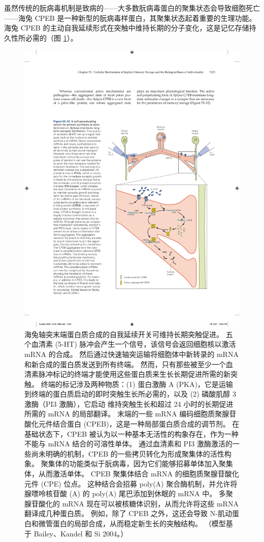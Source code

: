 虽然传统的朊病毒机制是致病的——大多数朊病毒蛋白的聚集状态会导致细胞死亡——海兔 CPEB 是一种新型的朊病毒样蛋白，其聚集状态起着重要的生理功能。 海兔 CPEB 的主动自我延续形式在突触中维持长期的分子变化，这是记忆存储持久性所必需的（图 \ref{fig:53_12}）。

\begin{figure}[htbp]
	\centering
	\includegraphics[width=0.7\linewidth]{chap53/fig_53_12}
	\caption{海兔轴突末端蛋白质合成的自我延续开关可维持长期突触促进。 五个血清素 (5-HT) 脉冲会产生一个信号，该信号会返回细胞核以激活 mRNA 的合成。 然后通过快速轴突运输将细胞体中新转录的 mRNA 和新合成的蛋白质发送到所有终端。 然而，只有那些被至少一个血清素脉冲标记的终端才能使用这些蛋白质来生长长期促进所需的新突触。 终端的标记涉及两种物质：(1) 蛋白激酶 A (PKA)，它是运输到终端的蛋白质启动的即时突触生长所必需的，以及 (2) 磷酸肌醇 3 激酶（PI3 激酶），它启动 维持突触生长和超过 24 小时的长期促进所需的 mRNA 的局部翻译。 末端的一些 mRNA 编码细胞质聚腺苷酸化元件结合蛋白 (CPEB)，这是一种局部蛋白质合成的调节剂。 在基础状态下，CPEB 被认为以一种基本无活性的构象存在，作为一种不能与 mRNA 结合的可溶性单体。 通过血清素和 PI3 激酶激活的一些尚未明确的机制，CPEB 的一些拷贝转化为形成聚集体的活性构象。 聚集体的功能类似于朊病毒，因为它们能够招募单体加入聚集体，从而激活单体。 CPEB 聚集体结合 mRNA 的细胞质聚腺苷酸化元件 (CPE) 位点。 这种结合会招募 poly(A) 聚合酶机制，并允许将腺嘌呤核苷酸 (A) 的 poly(A) 尾巴添加到休眠的 mRNA 中。 多聚腺苷酸化的 mRNA 现在可以被核糖体识别，从而允许将这些 mRNA 翻译成几种蛋白质。 例如，除了 CPEB 之外，这还会导致 N-肌动蛋白和微管蛋白的局部合成，从而稳定新生长的突触结构。 （模型基于 Bailey、Kandel 和 Si 2004。）}
	\label{fig:53_12}
\end{figure}

